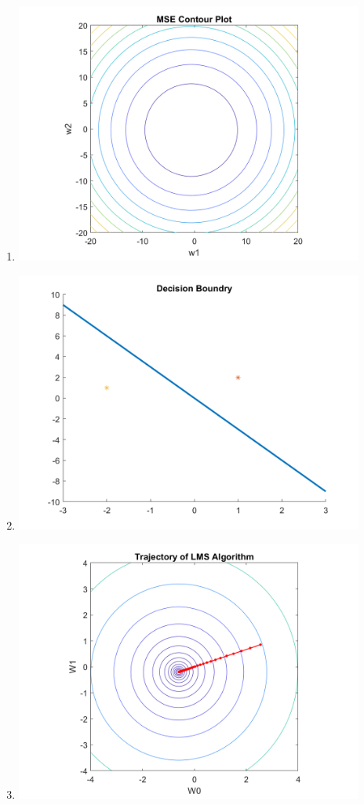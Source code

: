 \documentclass{article}
\begin{document}
\begin{enumerate} [label=\Alph*]
  \item \leavevmode \begin{center} \includegraphics[width=0.9\textwidth]{Problem9_A.png} \end{center}
  \item \leavevmode \begin{center} \includegraphics[width=0.9\textwidth]{Problem9_B.png} \end{center} 
  \item \leavevmode \begin{center} \includegraphics[width=0.9\textwidth]{Problem9_C.png} \end{center} 
\end{enumerate}
\end{document}
